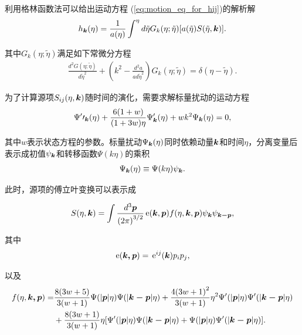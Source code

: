 利用格林函数法可以给出运动方程 (\ref{eq:motion_eq_for_hij})的解析解
\begin{align}\label{eq:hk_solution}
    h_{\boldsymbol{k}}(\eta)=\frac{1}{a(\eta)}\int^\eta d\tilde{\eta}
    G_k(\eta;\tilde{\eta})\lbrack
    a(\tilde{\eta})S(\tilde{\eta},\boldsymbol{k})\rbrack.
\end{align}

其中$G_k(\eta;\tilde{\eta})$满足如下常微分方程
\begin{align}
    \frac{d^2 G(\eta;\tilde{\eta})}{d\tilde{\eta}^2} + 
    \left(k^2 - \frac{d^2 a}{ad\tilde{\eta}^2}\right)G_k(\eta;\tilde{\eta})
    =
    \delta(\eta-\tilde{\eta}).
\end{align}

为了计算源项$S_{ij}(\eta,\boldsymbol{k})$随时间的演化，需要求解标量扰动的运动方程\citep{mukhanov1992theory,kodama1984cosmological}
\begin{align}
    \Psi^\prime\prime_{\boldsymbol{k}}(\eta) +
    \frac{6(1+w)}{(1+3w)\eta}\Psi^\prime_{\boldsymbol{k}}(\eta) +
    wk^2\Psi_{\boldsymbol{k}}(\eta) = 0,
\end{align}

其中$w$表示状态方程的参数。标量扰动$\Psi_{\boldsymbol{k}}(\eta)$同时依赖动量$\boldsymbol{k}$和时间$\eta$，分离变量后表示成初值$\psi_{\boldsymbol{k}}$和转移函数$\Psi(k\eta)$的乘积
\begin{align}\label{eq:scalar_pert}
    \Psi_{\boldsymbol{k}}(\eta) \equiv \Psi(k\eta)\psi_{\boldsymbol{k}}.
\end{align}

此时，源项的傅立叶变换可以表示成

\begin{align}\label{eq:source_term}
    S(\eta,\boldsymbol{k}) = \int \frac{d^3 \boldsymbol{p}}{{(2\pi)}^{3/2}}
    \,\mathrm{e}(\boldsymbol{k},\boldsymbol{p}) f(\eta,\boldsymbol{k},\boldsymbol{p})
    \psi_{\boldsymbol{k}}\psi_{\boldsymbol{k-p}},
\end{align}

其中
\begin{align}
    \,\mathrm{e}(\boldsymbol{k,p})=\,\mathrm{e}^{ij}(\boldsymbol{k})p_i p_j,
\end{align}

以及
\begin{equation}
\begin{split}
    f(\eta,\boldsymbol{k,p}) =
    & \frac{8(3w+5)}{3(w+1)}\Psi(|\boldsymbol{p}|\eta)\Psi(|\boldsymbol{k-p}|\eta) + 
    \frac{{4(3w+1)}^2}{3(w+1)}\eta^2\Psi^\prime(|\boldsymbol{p}|\eta)\Psi^\prime(|\boldsymbol{k-p}|\eta)
    \\
    & + \frac{8(3w+1)}{3(w+1)}\eta
    \lbrack
    \Psi^\prime(|\boldsymbol{p}|\eta)\Psi(|\boldsymbol{k-p}|\eta) + 
    \Psi(|\boldsymbol{p}|\eta)\Psi^\prime(|\boldsymbol{k-p}|\eta)
    \rbrack.
\end{split}
\end{equation}

